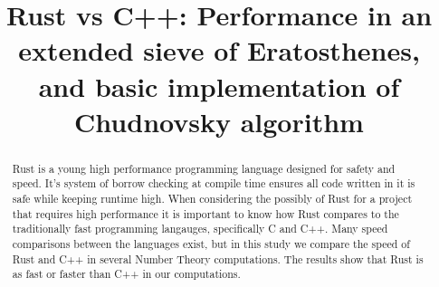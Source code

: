 \documentclass[10pt]{IEEEtran}
\begin{document}
\title{Rust vs C++: Performance in an extended sieve of Eratosthenes, and basic implementation of Chudnovsky algorithm}
\author{
}
\date{}

\maketitle

\begin{abstract}
Rust is a young high performance programming language designed for safety and speed.
It's system of borrow checking at compile time ensures all code written in it is safe while keeping runtime high.
When considering the possibly of Rust for a project that requires high performance it is important to know how Rust compares to the traditionally fast programming langauges, specifically C and C++.
Many speed comparisons between the languages exist, but in this study we compare the speed of Rust and C++ in several Number Theory computations.
The results show that Rust is as fast or faster than C++ in our computations.
\end{abstract}
\end{document}
